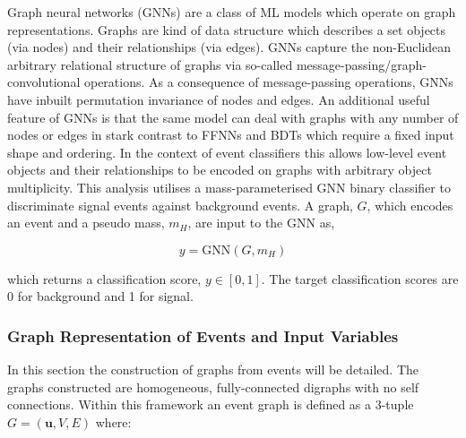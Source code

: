 %

Graph neural networks (GNNs) are a class of ML models which operate on graph representations. Graphs are kind of data structure which describes a set objects (via nodes) and their relationships (via edges). GNNs capture the non-Euclidean arbitrary relational structure of graphs via so-called message-passing/graph-convolutional operations. As a consequence of message-passing operations, GNNs have inbuilt permutation invariance of nodes and edges. An additional useful feature of GNNs is that the same model can deal with graphs with any number of nodes or edges in stark contrast to FFNNs and BDTs which require a fixed input shape and ordering. In the context of event classifiers this allows low-level event objects and their relationships to be encoded on graphs with arbitrary object multiplicity. This analysis utilises a mass-parameterised GNN binary classifier to discriminate signal events against background events. A graph, $G$, which encodes an event and a pseudo mass, $m_H$, are input to the GNN as,

\begin{equation}
    y=\mathrm{GNN}(G, m_H)
\end{equation}

which returns a classification score, $y\in[0,1]$. The target classification scores are 0 for background and 1 for signal. 

\subsubsection{Graph Representation of Events and Input Variables}
In this section the construction of graphs from events will be detailed. The graphs constructed are homogeneous, fully-connected digraphs with no self connections. Within this framework an event graph is defined as a 3-tuple $G=(\textbf{u}, V, E)$ where:

